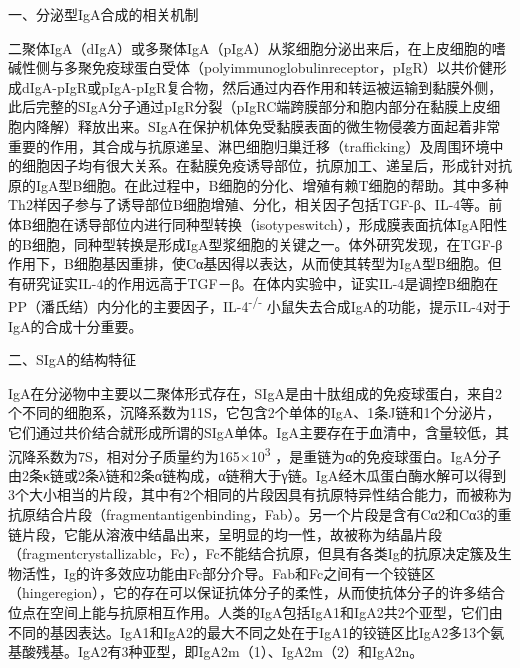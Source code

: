 \begin{center}
{\large 一、分泌型IgA合成的相关机制}
\end{center}
二聚体IgA（dIgA）或多聚体IgA（pIgA）从浆细胞分泌出来后，在上皮细胞的嗜碱性侧与多聚免疫球蛋白受体（polyimmunoglobulinreceptor，pIgR）以共价健形成dIgA-pIgR或pIgA-pIgR复合物，然后通过内吞作用和转运被运输到黏膜外侧，此后完整的SIgA分子通过pIgR分裂（pIgRC端跨膜部分和胞内部分在黏膜上皮细胞内降解）释放出来。SIgA在保护机体免受黏膜表面的微生物侵袭方面起着非常重要的作用，其合成与抗原递呈、淋巴细胞归巢迁移（trafficking）及周围环境中的细胞因子均有很大关系。在黏膜免疫诱导部位，抗原加工、递呈后，形成针对抗原的IgA型B细胞。在此过程中，B细胞的分化、增殖有赖T细胞的帮助。其中多种Th2样因子参与了诱导部位B细胞增殖、分化，相关因子包括TGF-β、IL-4等。前体B细胞在诱导部位内进行同种型转换（isotypeswitch），形成膜表面抗体IgA阳性的B细胞，同种型转换是形成IgA型浆细胞的关键之一。体外研究发现，在TGF-β作用下，B细胞基因重排，使Cα基因得以表达，从而使其转型为IgA型B细胞。但有研究证实IL-4的作用远高于TGF－β。在体内实验中，证实IL-4是调控B细胞在PP（潘氏结）内分化的主要因子，IL-4\textsuperscript{-/-}
小鼠失去合成IgA的功能，提示IL-4对于IgA的合成十分重要。

\begin{center}
{\large 二、SIgA的结构特征}
\end{center}
IgA在分泌物中主要以二聚体形式存在，SIgA是由十肽组成的免疫球蛋白，来自2个不同的细胞系，沉降系数为11S，它包含2个单体的IgA、1条J链和1个分泌片，它们通过共价结合就形成所谓的SIgA单体。IgA主要存在于血清中，含量较低，其沉降系数为7S，相对分子质量约为165×10\textsuperscript{3}
，是重链为α的免疫球蛋白。IgA分子由2条κ链或2条λ链和2条α链构成，α链稍大于γ链。IgA经木瓜蛋白酶水解可以得到3个大小相当的片段，其中有2个相同的片段因具有抗原特异性结合能力，而被称为抗原结合片段（fragmentantigenbinding，Fab）。另一个片段是含有Cα2和Cα3的重链片段，它能从溶液中结晶出来，呈明显的均一性，故被称为结晶片段（fragmentcrystallizablc，Fc），Fc不能结合抗原，但具有各类Ig的抗原决定簇及生物活性，Ig的许多效应功能由Fc部分介导。Fab和Fc之间有一个铰链区（hingeregion），它的存在可以保证抗体分子的柔性，从而使抗体分子的许多结合位点在空间上能与抗原相互作用。人类的IgA包括IgA1和IgA2共2个亚型，它们由不同的基因表达。IgA1和IgA2的最大不同之处在于IgA1的铰链区比IgA2多13个氨基酸残基。IgA2有3种亚型，即IgA2m（1）、IgA2m（2）和IgA2n。

